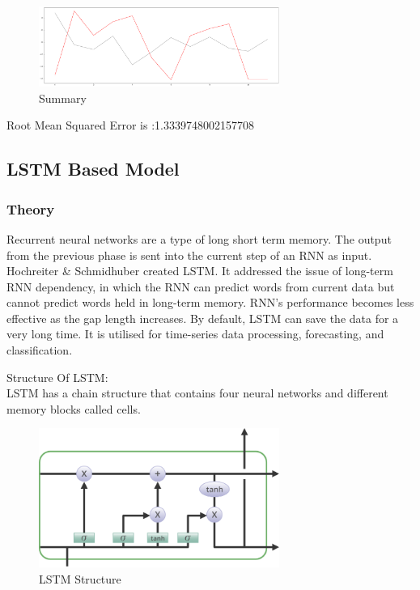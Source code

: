 \begin{figure}[H]
    \centering
    \includegraphics[width=0.7\textwidth]{Images/VAR_P.png}
    \caption{Summary}
    \label{fig1}
\end{figure}

Root Mean Squared Error is :1.3339748002157708









\subsection{LSTM Based Model}

\subsubsection{Theory}
Recurrent neural networks are a type of long short term memory. The output from the previous phase is sent into the current step of an RNN as input. Hochreiter & Schmidhuber created LSTM. It addressed the issue of long-term RNN dependency, in which the RNN can predict words from current data but cannot predict words held in long-term memory. RNN's performance becomes less effective as the gap length increases. By default, LSTM can save the data for a very long time. It is utilised for time-series data processing, forecasting, and classification.

Structure Of LSTM: \\
LSTM has a chain structure that contains four neural networks and different memory blocks called cells.

\begin{figure}[H]
    \centering
    \includegraphics[width=0.7\textwidth]{Images/lstm1.png}
    \caption{LSTM Structure}
    \label{fig1}
\end{figure}

